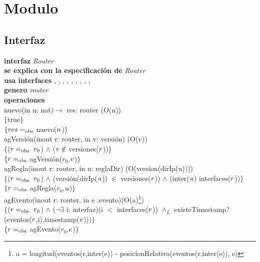 \section*{Modulo }

\subsection*{Interfaz}
\textbf{interfaz} \textit{Router}\\
\textbf{se explica con la especificaci\'on de} \textit{Router}\\
\textbf{usa interfaces} , , , , , , , , , \\
\textbf{genero} \textit{router}\\

\textbf{operaciones}\\

nuevo(in n: nat)$\rightarrow$ res: router  \hfill(O(n)) \\
$\{$true$\}$\\
$\{{res} =_{\mathrm{obs}}$ nuevo(${n}$)$\}$\\

agVersi\'on(inout r: router, in v: versi\'on) \hfill(O(v))\\
$\{$(${r} =_{\mathrm{obs}}\ r_0$) $\wedge$ (${v} \notin$ versiones(${r}$))$\}$\\
$\{{r} =_{\mathrm{obs}}$ agVersi\'on($r_0$,${v}$)$\}$\\

agRegla(inout r: router, in u: reglaDir) \hfill(O(version(dirIp(u)))) \\
$\{$(${r} =_{\mathrm{obs}}\ r_0$) $\wedge$ (versi\'on(dirIp(${u}$)) $\in$ versiones(${r}$)) $\wedge$ (inter(${u}$) interfaces(${r}$))$\}$\\
$\{{r} =_{\mathrm{obs}}$ agRegla($r_0$,${u}$)$\}$\\

agEvento(inout r: router, in e :evento)\hfill(O(a)\footnote{a = longitud(eventos(r,inter(e)) - posicionRelativa(eventos(r,inter(e)), e)}) \\
$\{$(${r} =_{\mathrm{obs}}\ r_0$) $\wedge$ ($\neg \exists$ i: interfaz)(i $<$ interfaces(${r}$)) $\wedge_L$ existeTimestamp?(eventos(${r}$,i),timestamp(${e}$)))$\}$\\
$\{{r}=_{\mathrm{obs}}$ agEvento($r_0$,${e}$)$\}$\\

